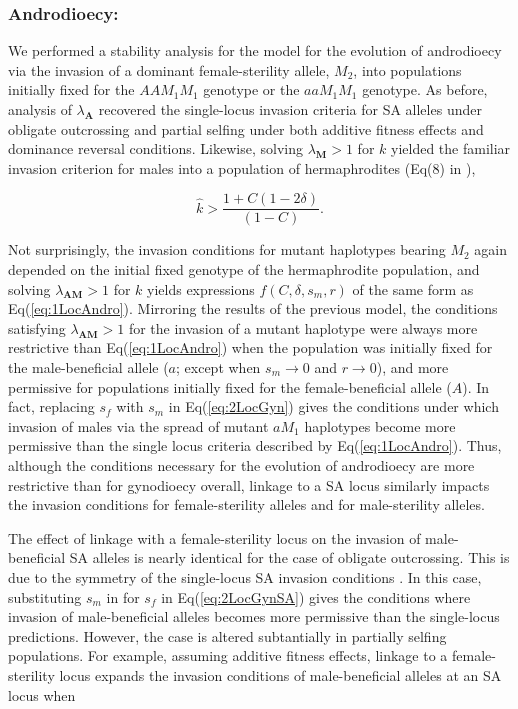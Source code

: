 \documentclass[9pt,twocolumn,twoside,lineno]{gsajnl}
\begin{document}
\subsubsection{Androdioecy:} We performed a stability analysis for the model for the evolution of androdioecy via the invasion of a dominant female-sterility allele, $M_2$, into populations initially fixed for the $AAM_1M_1$ genotype or the $aaM_1M_1$ genotype. As before, analysis of $\lambda_{\mathbf{A}}$ recovered the single-locus invasion criteria for SA alleles under obligate outcrossing and partial selfing under both additive fitness effects and dominance reversal conditions. Likewise, solving $\lambda_{\mathbf{M}} > 1$ for $k$ yielded the familiar invasion criterion for males into a population of hermaphrodites (Eq(8) in \citealt{Charlesworth1978a}),

\begin{equation}\label{eq:1LocAndro}
	\hat{k} > \frac{1 + C (1 - 2 \delta)}{(1 - C)}.
\end{equation}

\noindent Not surprisingly, the invasion conditions for mutant haplotypes bearing $M_2$ again depended on the initial fixed genotype of the hermaphrodite population, and solving $\lambda_{\mathbf{AM}} > 1$ for $k$ yields expressions $f(C,\delta,s_m,r)$ of the same form as Eq(\ref{eq:1LocAndro}). Mirroring the results of the previous model, the conditions satisfying $\lambda_{\mathbf{AM}} > 1$ for the invasion of a mutant haplotype were always more restrictive than Eq(\ref{eq:1LocAndro}) when the population was initially fixed for the male-beneficial allele ($a$; except when $s_m \rightarrow 0$ and $r \rightarrow 0$), and more permissive for populations initially fixed for the female-beneficial allele ($A$). In fact, replacing $s_f$ with $s_m$ in Eq(\ref{eq:2LocGyn}) gives the conditions under which invasion of males via the spread of mutant $aM_1$ haplotypes become more permissive than the single locus criteria described by Eq(\ref{eq:1LocAndro}). Thus, although the conditions necessary for the evolution of androdioecy are more restrictive than for gynodioecy overall, linkage to a SA locus similarly impacts the invasion conditions for female-sterility alleles and for male-sterility alleles. 

The effect of linkage with a female-sterility locus on the invasion of male-beneficial SA alleles is nearly identical for the case of obligate outcrossing. This is due to the symmetry of the single-locus SA invasion conditions \citep{Kidwell1977}. In this case, substituting $s_m$ in for $s_f$ in Eq(\ref{eq:2LocGynSA}) gives the conditions where invasion of male-beneficial alleles becomes more permissive than the single-locus predictions. However, the case is altered subtantially in partially selfing populations. For example, assuming additive fitness effects, linkage to a female-sterility locus expands the invasion conditions of male-beneficial alleles at an SA locus when
\end{document}
